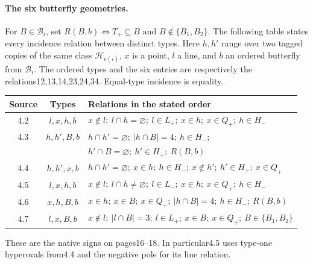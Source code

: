 \documentclass[11pt]{article}
\newcommand{\orb}{\mathcal B}\newcommand{\hyp}{\mathcal H}
\begin{document}
\paragraph{The six butterfly geometries.}
For $B\in\orb_i$, set
$R(B,b)\iff T_+\subseteq B\text{ and }B\notin\{B_1,B_2\}$.
The following table states every incidence relation between distinct types.
Here $h,h'$ range over two tagged copies of the same class
$\hyp_{e(i)}$, $x$ is a point, $l$ a line, and $b$ an ordered butterfly
from $\orb_i$. The ordered types and the six entries are respectively the
relations12,13,14,23,24,34. Equal-type incidence is equality.
\begin{center}\small
\renewcommand{\arraystretch}{1.25}
\begin{tabular}{ccl}
\toprule Source&Types&Relations in the stated order\\\midrule
4.2&$l,x,h,b$&$x\notin l;\ l\cap h=\varnothing;\ l\in L_+;\ x\in h;\ x\in Q_+;\ h\in H_-$\\
4.3&$h,h',B,b$&$h\cap h'=\varnothing;\ |h\cap B|=4;\ h\in H_-;$\\
&&$h'\cap B=\varnothing;\ h'\in H_+;\ R(B,b)$\\
4.4&$h,h',x,b$&$h\cap h'=\varnothing;\ x\in h;\ h\in H_-;\ x\notin h';\ h'\in H_+;\ x\in Q_+$\\
4.5&$l,x,h,b$&$x\notin l;\ l\cap h\ne\varnothing;\ l\in L_-;\ x\in h;\ x\in Q_+;\ h\in H_-$\\
4.6&$x,h,B,b$&$x\in h;\ x\in B;\ x\in Q_+;\ |h\cap B|=4;\ h\in H_-;\ R(B,b)$\\
4.7&$l,x,B,b$&$x\notin l;\ |l\cap B|=3;\ l\in L_+;\ x\in B;\ x\in Q_+;\ B\in\{B_1,B_2\}$\\
\bottomrule
\end{tabular}\end{center}
These are the native signs on pages16--18. In particular4.5 uses type-one
hyperovals from4.4 and the negative pole for its line relation.
\end{document}

